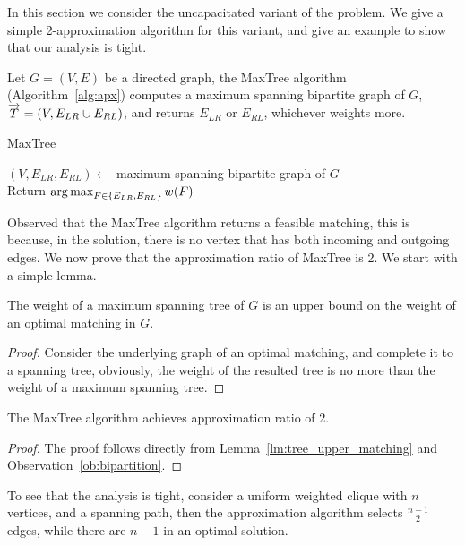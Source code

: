 \label{sub:ucudcm}
In this section we consider the uncapacitated variant of the problem. 
We give a simple 2-approximation algorithm for this variant, 
and give an example to show that our analysis is tight.

Let $G = (V, E)$ be a directed graph, 
the MaxTree algorithm (Algorithm~\ref{alg:apx})
computes a maximum spanning bipartite graph of $G$, 
$\overrightarrow{T} = (V, E_{LR} \cup E_{RL})$, 
and returns $E_{LR}$ or $E_{RL}$, 
whichever weights more.

\begin{algorithm}
\caption{
\label{alg:apx}
MaxTree}
$(V, E_{LR}, E_{RL}) \leftarrow$ maximum spanning bipartite graph of $G$	\\
Return $\operatorname*{arg\,max}_{F \in \{ E_{LR}, E_{RL} \}}{w(F)} $						\\
\end{algorithm}

Observed that the MaxTree algorithm returns a feasible matching,
this is because, in the solution, 
there is no vertex that has both incoming and outgoing edges.  
We now prove that the approximation ratio of MaxTree is 2.
We start with a simple lemma.

\begin{lemma}
\label{lm:tree_upper_matching}
The weight of a maximum spanning tree of $G$ is an upper bound on the weight of
an optimal matching in $G$.
\end{lemma}

\begin{proof}
Consider the underlying graph of an optimal matching, 
and complete it to a spanning tree, obviously, the
weight of the resulted tree is no more than the weight of a maximum spanning
tree.
\end{proof}

\begin{theorem}
The MaxTree algorithm achieves approximation ratio of 2.
\end{theorem}

\begin{proof}
The proof follows directly from 
Lemma~\ref{lm:tree_upper_matching} and Observation~\ref{ob:bipartition}.
\end{proof}

To see that the analysis is tight, 
consider a uniform weighted clique with $n$ vertices, 
and a spanning path, 
then the approximation algorithm selects $\frac{n - 1}{2}$ edges, 
while there are $n - 1$ in an optimal solution.  